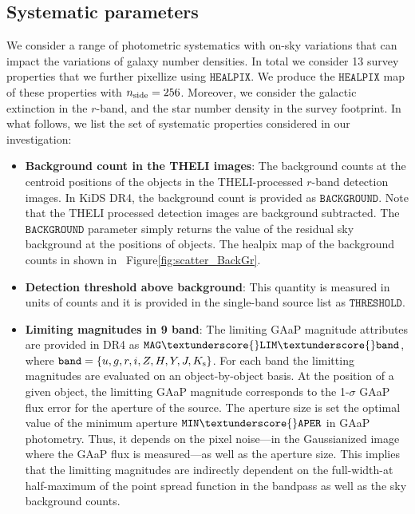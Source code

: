 \documentclass[fleqn,usenatbib,useAMS]{mnras}
\newcommand{\healpix}{\mathtt{HEALPIX}}
\begin{document}
\subsection{Systematic parameters}

We consider a range of photometric systematics with on-sky variations that can impact the variations of galaxy number densities. In total we consider 13 survey properties that we further pixellize using $\healpix$. We produce the $\healpix$ map of these properties with $n_{\rm side} = 256$. Moreover, we consider the galactic extinction in the $r$-band, and the star number density in the survey footprint. In what follows, we list the set of systematic properties considered in our investigation:

\begin{itemize}

  \item \textbf{Background count in the THELI images}: The background counts at the centroid positions of the objects in the THELI-processed $r$-band detection images. In KiDS DR4, the background count is provided as $\mathtt{BACKGROUND}$. Note that the THELI processed detection images are background subtracted. The $\mathtt{BACKGROUND}$ parameter simply returns the value of the residual sky background at the positions of objects. The healpix map of the background counts in shown in~ Figure\ref{fig:scatter_BackGr}.

  \item \textbf{Detection threshold above background}: This quantity is measured in units of counts and it is provided in the single-band source list as $\mathtt{THRESHOLD}$. 
  
  \item \textbf{Limiting magnitudes in 9 band}: The limiting GAaP magnitude attributes are provided in DR4 as $\mathtt{MAG}\textunderscore{}\mathtt{LIM}\textunderscore{} \mathtt{band}$, where $\mathtt{band} = \{u,g,r,i,Z,H,Y,J,K_{\rm s}\}$. 
  For each band the limitting magnitudes are evaluated on an object-by-object basis. At the position of a given object, the limitting GAaP magnitude corresponds to the 1-$\sigma$ GAaP flux error for the aperture of the source. The aperture size is set the optimal value of the minimum aperture $\mathtt{MIN}\textunderscore{}\mathtt{APER}$ in GAaP photometry. Thus, it depends on the pixel noise---in the Gaussianized image where the GAaP flux is measured---as well as the aperture size. This implies that the limitting magnitudes are indirectly dependent on the full-width-at half-maximum of the point spread function in the bandpass as well as the sky background counts.   
  

\end{itemize}
\end{document}
